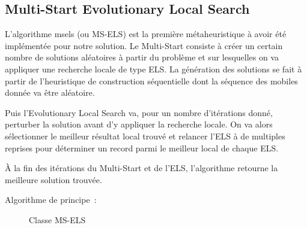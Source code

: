 		\subsection{Multi-Start Evolutionary Local Search}

			L'algorithme \acrlong{msels} (ou MS-ELS) est la première métaheuristique à avoir été implémentée pour notre solution. Le Multi-Start consiste à créer un certain nombre de solutions aléatoires à partir du problème et sur lesquelles on va appliquer une recherche locale de type ELS. La génération des solutions se fait à partir de l'heuristique de construction séquentielle dont la séquence des mobiles donnée va être aléatoire.

			Puis l'Evolutionary Local Search va, pour un nombre d'itérations donné, perturber la solution avant d'y appliquer la recherche locale. On va alors sélectionner le meilleur résultat local trouvé et relancer l'ELS à de multiples reprises pour déterminer un record parmi le meilleur local de chaque ELS.

			À la fin des itérations du Multi-Start et de l'ELS, l'algorithme retourne la meilleure solution trouvée.

			Algorithme de principe :
			\begin{code}
				\begin{algo}[informal]
					\BEGIN
									\ENDIF
								\ENDFOR
								\ENDIF
							\ENDFOR
						\ENDFOR
					\END
				\end{algo}
			\end{code}

			\begin{figure}[H]
			
				\centering
				\begin{tikzpicture}
					
				\end{tikzpicture}
				\caption[UML -- Métaheuristique MS-ELS]{Classe MS-ELS}
				\label{uml:ms-els}
			\end{figure}

